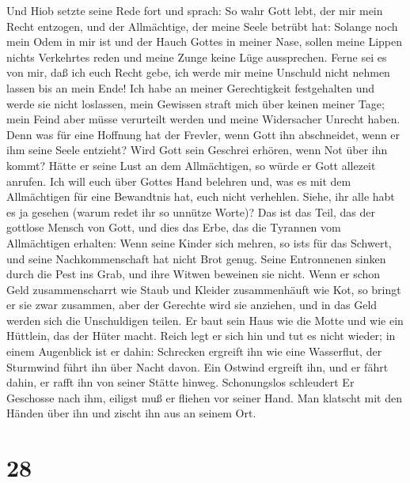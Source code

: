  Und Hiob setzte seine Rede fort und sprach:
 So wahr Gott lebt, der mir mein Recht entzogen, und der
Allmächtige, der meine Seele betrübt hat:  Solange noch
mein Odem in mir ist und der Hauch Gottes in meiner Nase, 
sollen meine Lippen nichts Verkehrtes reden und meine Zunge keine Lüge
aussprechen.  Ferne sei es von mir, daß ich euch Recht
gebe, ich werde mir meine Unschuld nicht nehmen lassen bis an mein Ende!
 Ich habe an meiner Gerechtigkeit festgehalten und werde
sie nicht loslassen, mein Gewissen straft mich über keinen meiner Tage;
 mein Feind aber müsse verurteilt werden und meine
Widersacher Unrecht haben.  Denn was für eine Hoffnung hat
der Frevler, wenn Gott ihn abschneidet, wenn er ihm seine Seele
entzieht?  Wird Gott sein Geschrei erhören, wenn Not über
ihn kommt?  Hätte er seine Lust an dem Allmächtigen, so
würde er Gott allezeit anrufen.  Ich will euch über
Gottes Hand belehren und, was es mit dem Allmächtigen für eine
Bewandtnis hat, euch nicht verhehlen.  Siehe, ihr alle
habt es ja gesehen (warum redet ihr so unnütze Worte)? 
Das ist das Teil, das der gottlose Mensch von Gott, und dies das Erbe,
das die Tyrannen vom Allmächtigen erhalten:  Wenn seine
Kinder sich mehren, so ist\textquotesingle s für das Schwert, und seine
Nachkommenschaft hat nicht Brot genug.  Seine Entronnenen
sinken durch die Pest ins Grab, und ihre Witwen beweinen sie nicht.
 Wenn er schon Geld zusammenscharrt wie Staub und Kleider
zusammenhäuft wie Kot,  so bringt er sie zwar zusammen,
aber der Gerechte wird sie anziehen, und in das Geld werden sich die
Unschuldigen teilen.  Er baut sein Haus wie die Motte und
wie ein Hüttlein, das der Hüter macht.  Reich legt er
sich hin und tut es nicht wieder; in einem Augenblick ist er dahin:
 Schrecken ergreift ihn wie eine Wasserflut, der
Sturmwind führt ihn über Nacht davon.  Ein Ostwind
ergreift ihn, und er fährt dahin, er rafft ihn von seiner Stätte hinweg.
 Schonungslos schleudert Er Geschosse nach ihm, eiligst
muß er fliehen vor seiner Hand.  Man klatscht mit den
Händen über ihn und zischt ihn aus an seinem Ort.

\hypertarget{section-27}{%
\section{28}\label{section-27}}


